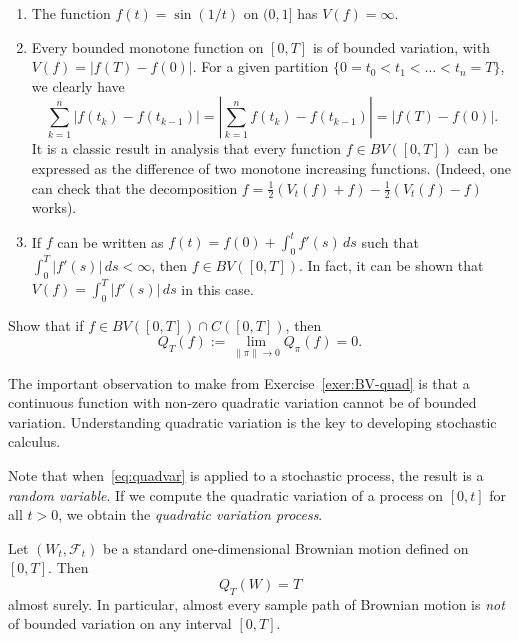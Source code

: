 \begin{example}
\begin{enumerate}[\upshape (i)]
    \item The function $f(t) = \sin(1/t)$ on $(0,1]$ has $V(f) = \infty$.
    
    \item Every bounded monotone function on $[0,T]$ is of bounded variation, with $V(f) = |f(T) - f(0)|$. For a given partition $\{0 = t_0 < t_1 < \ldots < t_n = T\}$, we clearly have
    \begin{equation*}
        \sum_{k=1}^n |f(t_k) - f(t_{k-1})| = \left| \sum_{k=1}^n f(t_k) - f(t_{k-1}) \right| = |f(T) - f(0)|.
    \end{equation*}
    It is a classic result in analysis that every function $f \in BV([0,T])$ can be expressed as the difference of two monotone increasing functions. (Indeed, one can check that the decomposition $f = \frac{1}{2}(V_t(f)+f) - \frac{1}{2}(V_t(f)-f)$ works).
    
    \item If $f$ can be written as $f(t) = f(0) + \int_0^t f'(s) \,ds$ such that $\int_0^T |f'(s)| \,ds < \infty$, then $f \in BV([0,T])$. In fact, it can be shown that $V(f) = \int_0^T |f'(s)| \,ds$ in this case.
\end{enumerate}
\end{example}

\begin{exercise}[Important!]
\label{exer:BV-quad}
Show that if $f \in BV([0,T])\cap C([0,T])$, then
\begin{equation*}
    Q_T(f) := \lim_{\|\pi\| \to 0} Q_\pi(f) = 0.
\end{equation*}
\end{exercise}
The important observation to make from Exercise~\ref{exer:BV-quad} is that a continuous function with non-zero quadratic variation cannot be of bounded variation. Understanding quadratic variation is the key to developing stochastic calculus.

\begin{remark}
    Note that when~\eqref{eq:quadvar} is applied to a stochastic process, the result is a \emph{random variable}. If we compute the quadratic variation of a process on $[0,t]$ for all $t>0$, we obtain the \emph{quadratic variation process}.
\end{remark}

\begin{theorem}
\label{thm:brownian-quadvar}
Let $(W_t, \mathcal{F}_t)$ be a standard one-dimensional Brownian motion defined on $[0,T]$. Then
\begin{equation*}
    Q_T(W) = T
\end{equation*}
almost surely. In particular, almost every sample path of Brownian motion is \emph{not} of bounded variation on any interval $[0,T]$.
\end{theorem}

